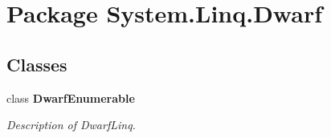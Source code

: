 \hypertarget{namespace_system_1_1_linq_1_1_dwarf}{
\section{Package System.Linq.Dwarf}
\label{namespace_system_1_1_linq_1_1_dwarf}
}
\subsection*{Classes}
\begin{DoxyCompactItemize}
\item 
class {\bfseries DwarfEnumerable}
\begin{DoxyCompactList}\small\item\em Description of DwarfLinq. \item\end{DoxyCompactList}\end{DoxyCompactItemize}
